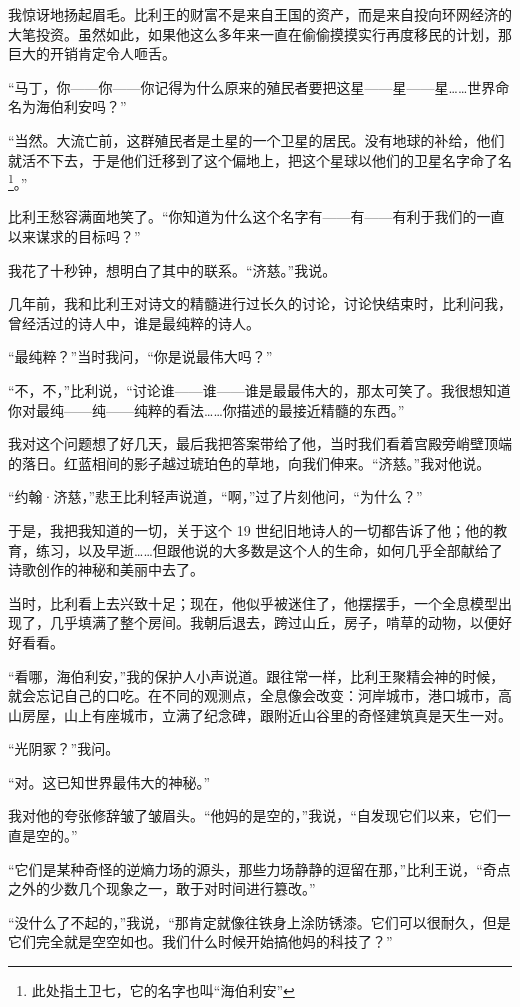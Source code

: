 \documentclass[AutoFakeBold=true]{book}
\begin{document}
我惊讶地扬起眉毛。比利王的财富不是来自王国的资产，而是来自投向环网经济的大笔投资。虽然如此，如果他这么多年来一直在偷偷摸摸实行再度移民的计划，那巨大的开销肯定令人咂舌。

``马丁，你——你——你记得为什么原来的殖民者要把这星——星——星……世界命名为海伯利安吗？''

``当然。大流亡前，这群殖民者是土星的一个卫星的居民。没有地球的补给，他们就活不下去，于是他们迁移到了这个偏地上，把这个星球以他们的卫星名字命了名\footnote{此处指土卫七，它的名字也叫``海伯利安''}。''

比利王愁容满面地笑了。``你知道为什么这个名字有——有——有利于我们的一直以来谋求的目标吗？''

我花了十秒钟，想明白了其中的联系。``济慈。''我说。

几年前，我和比利王对诗文的精髓进行过长久的讨论，讨论快结束时，比利问我，曾经活过的诗人中，谁是最纯粹的诗人。

``最纯粹？''当时我问，``你是说最伟大吗？''

``不，不，''比利说，``讨论谁——谁——谁是最最伟大的，那太可笑了。我很想知道你对最纯——纯——纯粹的看法……你描述的最接近精髓的东西。''

我对这个问题想了好几天，最后我把答案带给了他，当时我们看着宫殿旁峭壁顶端的落日。红蓝相间的影子越过琥珀色的草地，向我们伸来。``济慈。''我对他说。

``约翰·济慈，''悲王比利轻声说道，``啊，''过了片刻他问，``为什么？''

于是，我把我知道的一切，关于这个 19 世纪旧地诗人的一切都告诉了他；他的教育，练习，以及早逝……但跟他说的大多数是这个人的生命，如何几乎全部献给了诗歌创作的神秘和美丽中去了。

当时，比利看上去兴致十足；现在，他似乎被迷住了，他摆摆手，一个全息模型出现了，几乎填满了整个房间。我朝后退去，跨过山丘，房子，啃草的动物，以便好好看看。

``看哪，海伯利安，''我的保护人小声说道。跟往常一样，比利王聚精会神的时候，就会忘记自己的口吃。在不同的观测点，全息像会改变：河岸城市，港口城市，高山房屋，山上有座城市，立满了纪念碑，跟附近山谷里的奇怪建筑真是天生一对。

``光阴冢？''我问。

``对。这已知世界最伟大的神秘。''

我对他的夸张修辞皱了皱眉头。``他妈的是空的，''我说，``自发现它们以来，它们一直是空的。''

``它们是某种奇怪的逆熵力场的源头，那些力场静静的逗留在那，''比利王说，``奇点之外的少数几个现象之一，敢于对时间进行篡改。''

``没什么了不起的，''我说，``那肯定就像往铁身上涂防锈漆。它们可以很耐久，但是它们完全就是空空如也。我们什么时候开始搞他妈的科技了？''
\end{document}
